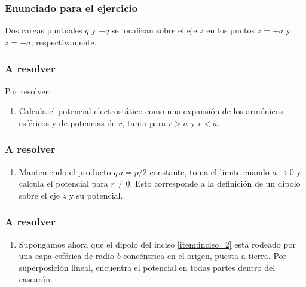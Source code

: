 \documentclass[12pt]{beamer}
\begin{document}
\begin{frame}
\frametitle{Enunciado para el ejercicio}
Dos cargas puntuales $q$ y $-q$ se localizan sobre el eje $z$ en los puntos $z = +a$ y $z = -a$, respectivamente.
\pause
\begin{figure}[H]
    \centering
\end{figure}
\end{frame}
\begin{frame}
\frametitle{A resolver}
Por resolver:
\pause
{}
\begin{enumerate}[<+->]
\item \label{item:inciso_1} Calcula el potencial electrostático como una expansión de los armónicos esféricos y de potencias de $r$, tanto para $r > a$ y $r < a$.
\seti
\end{enumerate}
\end{frame}
\begin{frame}
\frametitle{A resolver}
\begin{enumerate}[<+->]    
\conti
\item \label{item:inciso_2} Manteniendo el producto $q \, a = p /2$ constante, toma el límite cuando $a \to 0$ y calcula el potencial para $r \neq 0$. \pause Esto corresponde a la definición de un dipolo sobre el eje $z$ y su potencial.
\seti
\end{enumerate}
\end{frame}
\begin{frame}
\frametitle{A resolver}
\begin{enumerate}[<+->]    
\conti
\item \label{item:inciso_3} Supongamos ahora que el dipolo del inciso \ref{item:inciso_2} está rodeado por una capa esférica de radio $b$ concéntrica en el origen, puesta a tierra. Por superposición lineal, encuentra el potencial en todas partes dentro del cascarón.
\end{enumerate}
\end{frame}
\end{document}
